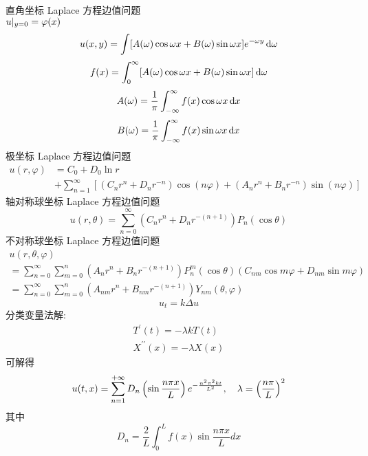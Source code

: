 \documentclass[UTF8,9pt]{ctexart}
\begin{document}
直角坐标 Laplace 方程边值问题\\
$u|_{y=0}=\varphi(x)$
$$u(x,y) = \int [A(\omega)\cos \omega x+B(\omega)\sin \omega x]e^{-\omega y} \mathop{}\!\mathrm{d} \omega$$
$$f(x) = \int_0^\infty  [A(\omega)\cos \omega x+B(\omega)\sin \omega x] \mathop{}\!\mathrm{d} \omega$$
$$A(\omega) = \frac{1}{\pi}\int_{-\infty}^\infty f(x)\cos\omega x\mathop{}\!\mathrm{d} x$$
$$B(\omega) = \frac{1}{\pi}\int_{-\infty}^\infty f(x)\sin\omega x\mathop{}\!\mathrm{d} x$$
极坐标 Laplace 方程边值问题
$$ 
\begin{aligned} u(r, \varphi) &=C_{0}+D_{0} \ln r \\ &+\sum_{n=1}^{\infty}\left[\left(C_{n} r^{n}+D_{n} r^{-n}\right) \cos (n \varphi)+\left(A_{n} r^{n}+B_{n} r^{-n}\right) \sin (n \varphi)\right] \end{aligned}
$$
轴对称球坐标 Laplace 方程边值问题$$ 
u(r, \theta)=\sum_{n=0}^{\infty}\left(C_{n} r^{n}+D_{n} r^{-(n+1)}\right) P_{n}(\cos \theta)
$$
不对称球坐标 Laplace 方程边值问题$$ 
\begin{array}{l}{u(r, \theta, \varphi)} \\ {=\sum_{n=0}^{\infty} \sum_{m=0}^{n}\left(A_{n} r^{n}+B_{n} r^{-(n+1)}\right) P_{n}^{m}(\cos \theta)\left(C_{n m} \cos m \varphi+D_{n m} \sin m \varphi\right)} \\ {=\sum_{n=0}^{\infty} \sum_{m=0}^{n}\left(A_{n m} r^{n}+B_{n m} r^{-(n+1)}\right) Y_{n m}(\theta, \varphi)}\end{array}
$$
$$ 
u_{t}=k \Delta u
$$
分类变量法解:
$$ 
\begin{array}{l}{T^{\prime}(t)=-\lambda k T(t)} \\ {X^{\prime \prime}(x)=-\lambda X(x)}\end{array}
$$
可解得$$ 
u(t, x)=\sum_{n=1}^{+\infty} D_{n}\left(\sin \frac{n \pi x}{L}\right) e^{-\frac{n^{2} \pi^{2} k t}{L^{2}}},\quad \lambda =\left( \frac{n\pi}{L} \right)^2
$$
其中
$$ 
D_{n}=\frac{2}{L} \int_{0}^{L} f(x) \sin \frac{n \pi x}{L} d x$$
\end{document}
